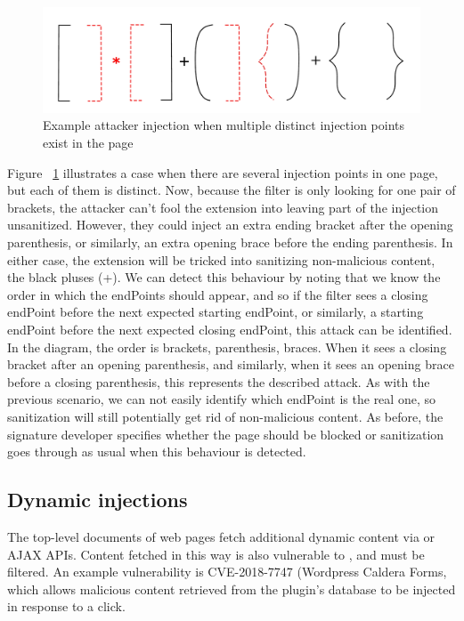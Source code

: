 \begin{figure}[h]
	\includegraphics[scale=0.25]{img/attacker_injection_unique.pdf}
	\caption{Example attacker injection when multiple distinct injection points exist in the page}
	\label{fig:attacker_injection_unique}
\end{figure}


Figure ~\ref{fig:attacker_injection_unique} illustrates a case when there are several injection points in one page, but each of them is distinct. Now, because the filter is only looking for one pair of brackets, the attacker can't fool the extension into leaving part of the injection unsanitized. However, they could inject an extra ending bracket after the opening parenthesis, or similarly, an extra opening brace before the ending parenthesis. In either case, the extension will be tricked into sanitizing non-malicious content, the black pluses (+). We can detect this behaviour by noting that we know the order in which the endPoints should appear, and so if the filter sees a closing endPoint before the next expected starting endPoint, or similarly, a starting endPoint before the next expected closing endPoint, this attack can be identified. In the diagram, the order is brackets, parenthesis, braces. When it sees a closing bracket after an opening parenthesis, and similarly, when it sees an opening brace before a closing parenthesis, this represents the described attack. As with the previous scenario, we can not easily identify which endPoint is the real one, so sanitization will still potentially get rid of non-malicious content. As before, the signature developer specifies whether the page should be blocked or sanitization goes through as usual when this behaviour is detected.

\subsection{Dynamic injections} \label{dynamic_injections}

The top-level documents of web pages fetch additional dynamic content
via  or AJAX APIs. Content fetched in
this way is also vulnerable to \xss, and must be filtered. An example
vulnerability is CVE-2018-7747 (Wordpress Caldera Forms, which allows malicious
content retrieved from the plugin's database to be injected in response to a click.


